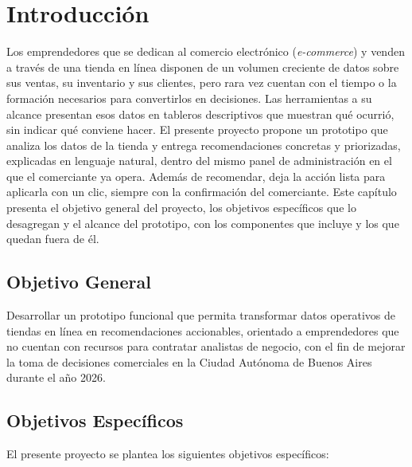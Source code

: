 \chapter{Introducción}
\label{cha:introduccion}

Los emprendedores que se dedican al comercio electrónico (\emph{e-commerce}) y venden a través de una tienda en línea disponen de un volumen creciente de datos sobre sus ventas, su inventario y sus clientes, pero rara vez cuentan con el tiempo o la formación necesarios para convertirlos en decisiones. Las herramientas a su alcance presentan esos datos en tableros descriptivos que muestran qué ocurrió, sin indicar qué conviene hacer. El presente proyecto propone un prototipo que analiza los datos de la tienda y entrega recomendaciones concretas y priorizadas, explicadas en lenguaje natural, dentro del mismo panel de administración en el que el comerciante ya opera.
Además de recomendar, deja la acción lista para aplicarla con un clic, siempre con la confirmación del comerciante. Este capítulo presenta el objetivo general del proyecto, los objetivos específicos que lo desagregan y el alcance del prototipo, con los componentes que incluye y los que quedan fuera de él.

\section{Objetivo General}
\label{sec:objetivo-general}

Desarrollar un prototipo funcional que permita transformar datos operativos de tiendas en línea en recomendaciones accionables, orientado a emprendedores que no cuentan con recursos para contratar analistas de negocio, con el fin de mejorar la toma de decisiones comerciales en la Ciudad Autónoma de Buenos Aires durante el año 2026.

\section{Objetivos Específicos}
\label{sec:objetivos-especificos}

El presente proyecto se plantea los siguientes objetivos específicos:

